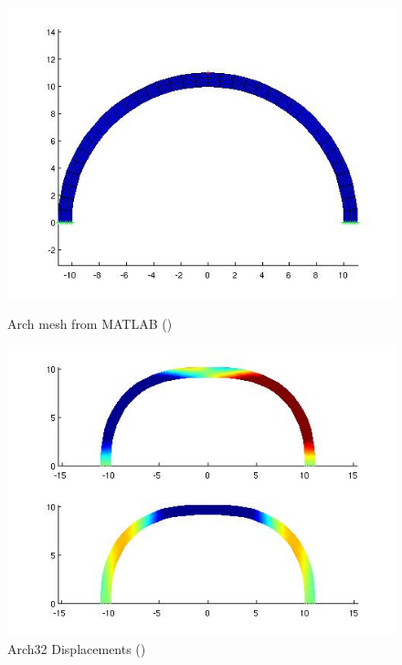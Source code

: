 \begin{figure}[htbp]
  \begin{minipage}{0.45\linewidth}
    \includegraphics[width=\linewidth]{fig/arch32_mesh_matlab.jpg}
    \caption{Arch mesh from MATLAB ()}
    \label{fig:Arch32MeshMATLAB}
  \end{minipage}
  \hfill
  \begin{minipage}{0.45\linewidth}
    \includegraphics[width=\linewidth]{fig/arch32_disp_matlab.jpg}
    \caption{Arch32 Displacements  ()}
    \label{fig:Arch32Displacements}
  \end{minipage}
\end{figure}
